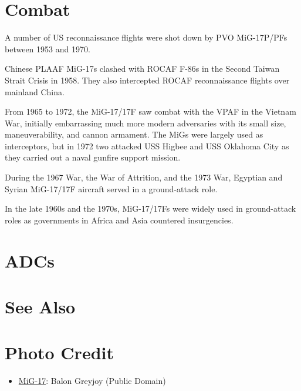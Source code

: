 \section{Combat}

A number of US reconnaissance flights were shot down by PVO MiG-17P/PFs between 1953 and 1970.

Chinese PLAAF MiG-17s clashed with ROCAF F-86s in the Second Taiwan Strait Crisis in 1958. They also intercepted ROCAF reconnaissance flights over mainland China.

From 1965 to 1972, the MiG-17/17F saw combat with the VPAF in the Vietnam War, initially embarrassing much more modern adversaries with its small size, maneuverability, and cannon armament. The MiGs were largely used as interceptors, but in 1972 two attacked USS Higbee and USS Oklahoma City as they carried out a naval gunfire support mission.

During the 1967 War, the War of Attrition, and the 1973 War, Egyptian and Syrian MiG-17/17F aircraft served in a ground-attack role.

In the late 1960s and the 1970s, MiG-17/17Fs were widely used in ground-attack roles as governments in Africa and Asia countered insurgencies.

\section{ADCs}

\begin{adclist}
\end{adclist}

\section{See Also}
\begin{typelist}
\end{typelist}

\section{Photo Credit}
\begin{itemize}\raggedright
    \item \href{https://commons.wikimedia.org/wiki/File:MiG-17_Takes_to_the_Sky_(cropped).jpg}{MiG-17}: Balon Greyjoy (Public Domain)
\end{itemize}
